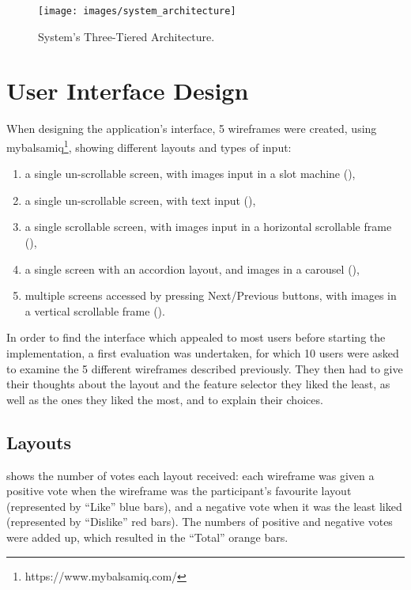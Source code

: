 \documentclass{mproj}
\begin{document}
\begin{figure}[h]
	\centering
	\texttt{[image: images/system\_architecture]}
	\caption{System's Three-Tiered Architecture.}
	\label{fig:architecture}
\end{figure}

\section{User Interface Design}\label{wireframes}

When designing the application's interface, 5 wireframes were created, using mybalsamiq\footnote{https://www.mybalsamiq.com/}, showing different layouts and types of input:
\begin{enumerate}[label=\Alph*.,topsep=0pt]
	\item a single un-scrollable screen, with images input in a slot machine (),
	\item a single un-scrollable screen, with text input (),
	\item a single scrollable screen, with images input in a horizontal scrollable frame (),
	\item a single screen with an accordion layout, and images in a carousel (),
	\item multiple screens accessed by pressing Next/Previous buttons, with images in a vertical scrollable frame ().
\end{enumerate}
	
In order to find the interface which appealed to most users before starting the implementation, a first evaluation was undertaken, for which 10 users were asked to examine the 5 different wireframes described previously. They then had to give their thoughts about the layout and the feature selector they liked the least, as well as the ones they liked the most, and to explain their choices.

\subsection*{Layouts}

 shows the number of votes each layout received: each wireframe was given a positive vote when the wireframe was the participant's favourite layout (represented by ``Like'' blue bars), and a negative vote when it was the least liked (represented by ``Dislike'' red bars). The numbers of positive and negative votes were added up, which resulted in the ``Total'' orange bars. 
\end{document}
